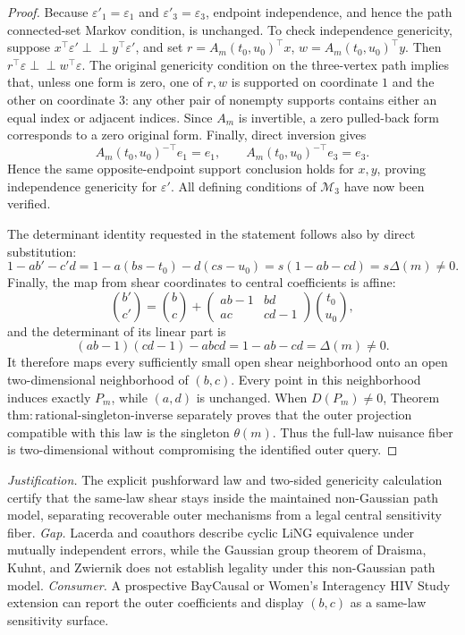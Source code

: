 \documentclass{article}
\begin{document}
\begin{proof}
Because \(\varepsilon'_1=\varepsilon_1\) and \(\varepsilon'_3=\varepsilon_3\), endpoint independence, and hence the path connected-set Markov condition, is unchanged. To check independence genericity, suppose \(x^\top\varepsilon'\perp\!\!\!\perp y^\top\varepsilon'\), and set \(r=A_m(t_0,u_0)^\top x\), \(w=A_m(t_0,u_0)^\top y\). Then \(r^\top\varepsilon\perp\!\!\!\perp w^\top\varepsilon\). The original genericity condition on the three-vertex path implies that, unless one form is zero, one of \(r,w\) is supported on coordinate \(1\) and the other on coordinate \(3\): any other pair of nonempty supports contains either an equal index or adjacent indices. Since \(A_m\) is invertible, a zero pulled-back form corresponds to a zero original form. Finally, direct inversion gives
\[
A_m(t_0,u_0)^{-\top}e_1=e_1,
\qquad
A_m(t_0,u_0)^{-\top}e_3=e_3.
\]
Hence the same opposite-endpoint support conclusion holds for \(x,y\), proving independence genericity for \(\varepsilon'\). All defining conditions of \(\mathcal M_3\) have now been verified.

The determinant identity requested in the statement follows also by direct substitution:
\[
1-ab'-c'd
=1-a(bs-t_0)-d(cs-u_0)
=s(1-ab-cd)=s\Delta(m)\neq0.
\]
Finally, the map from shear coordinates to central coefficients is affine:
\[
\binom{b'}{c'}=
\binom bc+
\begin{pmatrix}ab-1&bd\\ac&cd-1\end{pmatrix}
\binom{t_0}{u_0},
\]
and the determinant of its linear part is
\[
(ab-1)(cd-1)-abcd=1-ab-cd=\Delta(m)\neq0.
\]
It therefore maps every sufficiently small open shear neighborhood onto an open two-dimensional neighborhood of \((b,c)\). Every point in this neighborhood induces exactly \(P_m\), while \((a,d)\) is unchanged. When \(D(P_m)\neq0\), Theorem \(\mathrm{thm:rational\mbox{-}singleton\mbox{-}inverse}\) separately proves that the outer projection compatible with this law is the singleton \(\theta(m)\). Thus the full-law nuisance fiber is two-dimensional without compromising the identified outer query.
\end{proof}
\par\smallskip\noindent \textit{Justification.} The explicit pushforward law and two-sided genericity calculation certify that the same-law shear stays inside the maintained non-Gaussian path model, separating recoverable outer mechanisms from a legal central sensitivity fiber. \textit{Gap.} Lacerda and coauthors describe cyclic LiNG equivalence under mutually independent errors, while the Gaussian group theorem of Draisma, Kuhnt, and Zwiernik does not establish legality under this non-Gaussian path model. \textit{Consumer.} A prospective BayCausal or Women's Interagency HIV Study extension can report the outer coefficients and display \((b,c)\) as a same-law sensitivity surface.
\end{document}
